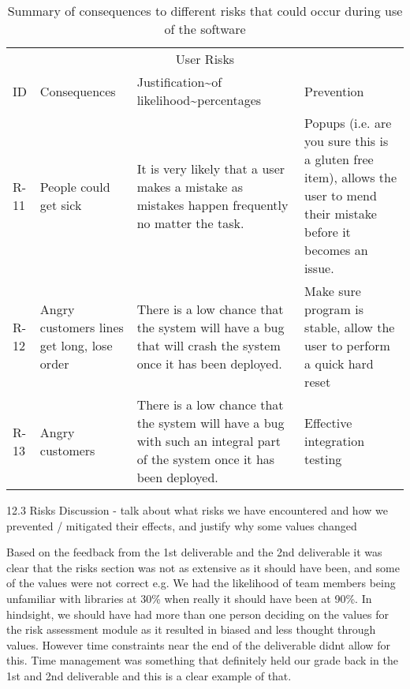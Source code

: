 \begin{table}
    \centering
    \caption{Summary of consequences to different risks that could occur during use of the software}
    \begin{tabular}{llll}
        \multicolumn{4}{c}{User Risks}                                                                                                                                                                                                                                                                            \\
        ID   & Consequences                               & Justification\textasciitilde{}of likelihood\textasciitilde{}percentages                                                   & Prevention                                                                                                                \\
        R-11 & People could get sick                      & It is very likely that a user makes a mistake as mistakes happen frequently no matter the task.                           & Popups (i.e. are you sure this is a gluten free item), allows the user to mend their mistake before it becomes an issue.  \\
        R-12 & Angry customers lines get long, lose order & There is a low chance that the system will have a bug that will crash the system once it has been deployed.               & Make sure program is stable, allow the user to perform a quick hard reset                                                 \\
        R-13 & Angry customers                            & There is a low chance that the system will have a bug with such an integral part of the system once it has been deployed. & Effective integration testing
    \end{tabular}
\end{table}


12.3 Risks Discussion - talk about what risks we have encountered and how we prevented / mitigated their effects, and justify why some values changed

Based on the feedback from the 1st deliverable and the 2nd deliverable it was clear that the risks section was not as extensive as it should have been, and some of the values were not correct e.g. We had the likelihood of team members being unfamiliar with libraries at 30\% when really it should have been at 90\%. In hindsight, we should have had more than one person deciding on the values for the risk assessment module as it resulted in biased and less thought through values. However time constraints near the end of the deliverable didnt allow for this. Time management was something that definitely held our grade back in the 1st and 2nd deliverable and this is a clear example of that.

